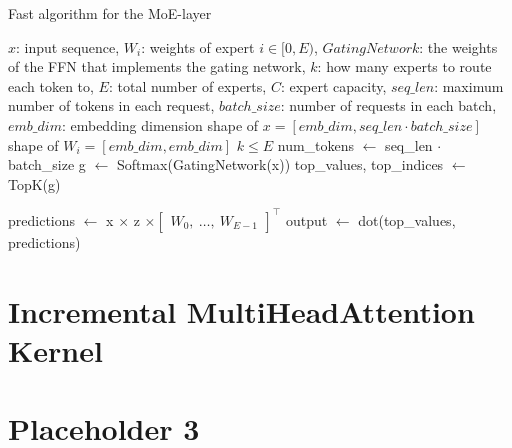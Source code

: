 \begin{algorithm}[H]
  \caption{Fast algorithm for the MoE-layer}
  \label{alg:parallel-moe}
  \small
  \begin{algorithmic}[1]
    \Ensure $x$: input sequence, $W_{i}$: weights of expert $i \in [0, E)$, $GatingNetwork$: the weights of the FFN that implements the gating network, $k$: how many experts to route each token to, $E$: total number of experts, $C$: expert capacity, $seq\_len$: maximum number of tokens in each request, $batch\_size$: number of requests in each batch, $emb\_dim$: embedding dimension
    \Require shape of $x = [emb\_dim, seq\_len \cdot batch\_size]$
    \Require shape of $W_{i} = [emb\_dim, emb\_dim]$
    \Require $k \leq E$
    \State num\_tokens $\leftarrow$ seq\_len $\cdot$ batch\_size
    \State g $\leftarrow$ Softmax(GatingNetwork(x))
    \State top\_values, top\_indices $\leftarrow$ TopK(g)

    \State
    
    \State
    
    \State predictions $\leftarrow$ x $\times$ z $\times \begin{bmatrix} W_0, \ \dots, \ W_{E-1} \end{bmatrix}^\top$
    \State output $\leftarrow$ dot(top\_values, predictions)

  \end{algorithmic}
\end{algorithm}


\section{Incremental MultiHeadAttention Kernel}

\section{Placeholder 3}

